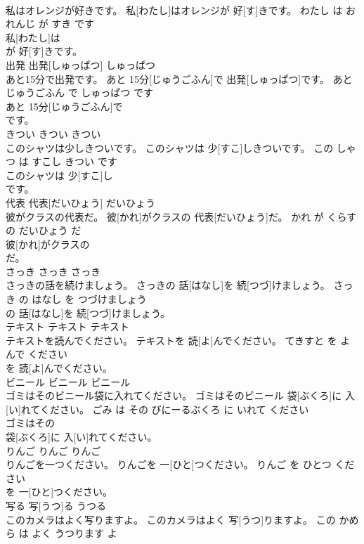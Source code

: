 \documentclass[8pt]{extreport}
\begin{document}
\begin{CJK}{UTF8}{min}
\\	私はオレンジが好きです。	私[わたし]はオレンジが 好[す]きです。	わたし は おれんじ が すき です	
\\	私[わたし]は
\\	が 好[す]きです。			
\\	出発	出発[しゅっぱつ]	しゅっぱつ	
\\	あと15分で出発です。	あと 15分[じゅうごふん]で 出発[しゅっぱつ]です。	あと じゅうごふん で しゅっぱつ です	
\\	あと 15分[じゅうごふん]で
\\	です。			
\\	きつい	きつい	きつい	
\\	このシャツは少しきついです。	このシャツは 少[すこ]しきついです。	この しゃつ は すこし きつい です	
\\	このシャツは 少[すこ]し
\\	です。			
\\	代表	代表[だいひょう]	だいひょう	
\\	彼がクラスの代表だ。	彼[かれ]がクラスの 代表[だいひょう]だ。	かれ が くらす の だいひょう だ	
\\	彼[かれ]がクラスの
\\	だ。			
\\	さっき	さっき	さっき	
\\	さっきの話を続けましょう。	さっきの 話[はなし]を 続[つづ]けましょう。	さっき の はなし を つづけましょう	
\\	の 話[はなし]を 続[つづ]けましょう。			
\\	テキスト	テキスト	テキスト	
\\	テキストを読んでください。	テキストを 読[よ]んでください。	てきすと を よんで ください	
\\	を 読[よ]んでください。			
\\	ビニール	ビニール	ビニール	
\\	ゴミはそのビニール袋に入れてください。	ゴミはそのビニール 袋[ぶくろ]に 入[い]れてください。	ごみ は その びにーるぶくろ に いれて ください	
\\	ゴミはその
\\	袋[ぶくろ]に 入[い]れてください。			
\\	りんご	りんご	りんご	
\\	りんごを一つください。	りんごを 一[ひと]つください。	りんご を ひとつ ください	
\\	を 一[ひと]つください。			
\\	写る	写[うつ]る	うつる	
\\	このカメラはよく写りますよ。	このカメラはよく 写[うつ]りますよ。	この かめら は よく うつります よ	

\end{CJK}
\end{document}
